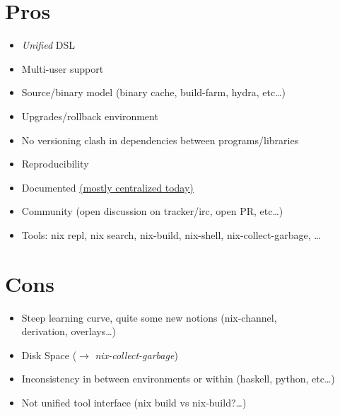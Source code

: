 \documentclass[smaller]{beamer}
\begin{document}
\section{Pros}
\label{sec:org817aeda}
\begin{itemize}
\item \alert{\alert{\emph{Unified} DSL}}\\
\item \alert{\alert{Multi-user}} support\\
\item \alert{\alert{Source/binary}} model (binary cache, build-farm, hydra, etc\ldots{})\\
\item \alert{\alert{Upgrades/rollback}} environment\\
\item \alert{\alert{No versioning clash}} in dependencies between programs/libraries\\
\item \alert{\alert{Reproducibility}}\\
\item \alert{\alert{Documented}} \href{https://nixos.org/}{(mostly centralized today)}\\
\item \alert{\alert{Community}} (open discussion on tracker/irc, open PR, etc\ldots{})\\
\item \alert{\alert{Tools}}: nix repl, nix search, nix-build, nix-shell, nix-collect-garbage, \ldots{}\\
\end{itemize}

\section{Cons}
\label{sec:org50a6500}

\begin{itemize}
\item \alert{\alert{Steep}} learning curve, quite some new notions (nix-channel,\\
derivation, overlays\ldots{})\\
\item \alert{\alert{Disk Space}} (\(\rightarrow\) \emph{nix-collect-garbage})\\
\item Inconsistency in between environments or within (haskell, python, etc\ldots{})\\
\item Not unified tool interface (nix build vs nix-build?\ldots{})\\
\end{itemize}
\end{document}
